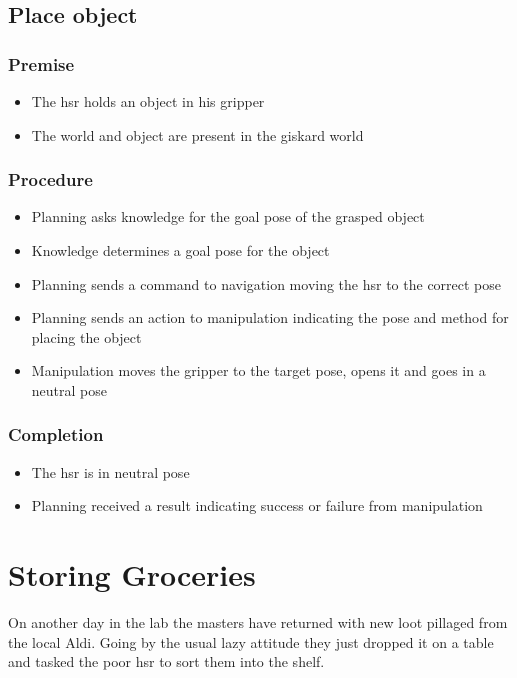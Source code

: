 \documentclass[main.tex]{subfiles}
\begin{document}
	\subsection{Place object}
	
	\subsubsection{Premise}
	\begin{itemize}
		\item The hsr holds an object in his gripper
		\item The world and object are present in the giskard world
	\end{itemize} 
	
	\subsubsection{Procedure}
	\begin{itemize}			
		\item Planning asks knowledge for the goal pose of the grasped object
		\item Knowledge determines a goal pose for the object
		\item Planning sends a command to navigation moving the hsr to the correct pose
		\item Planning sends an action to manipulation indicating the pose and method for placing the object
		\item Manipulation moves the gripper to the target pose, opens it and goes in a neutral pose 				
	\end{itemize}
	
	\subsubsection{Completion}
	\begin{itemize}
		\item The hsr is in neutral pose
		\item Planning received a result indicating success or failure from manipulation				
	\end{itemize}
	
	\section{Storing Groceries}
	On another day in the lab the masters have returned with new loot pillaged from the local Aldi. Going by the usual lazy attitude they just dropped it on a table and tasked the poor hsr to sort them into the shelf. 
	
\end{document}
